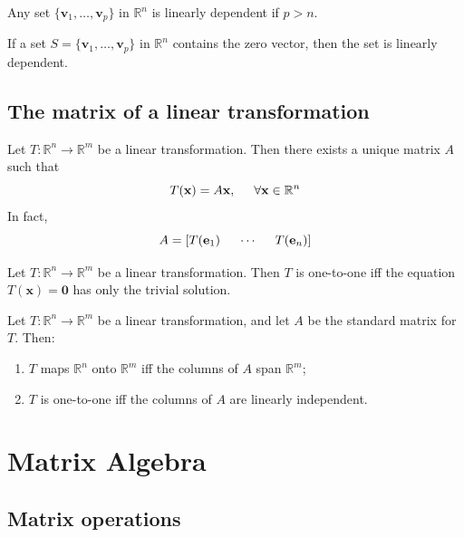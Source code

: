 \documentclass{article}
\begin{document}
\begin{thm}
    Any set $\{\textbf{v}_1,\ldots,\textbf{v}_p\}$ in $\mathbb{R}^n$ is linearly dependent if $p>n$.
\end{thm}

\begin{thm}
    If a set $S=\{\textbf{v}_1,\ldots,\textbf{v}_p\}$ in $\mathbb{R}^n$ contains the zero vector, then the set is linearly dependent.
\end{thm}

\subsection{The matrix of a linear transformation}

\begin{thm}
    Let $T:\mathbb{R}^n\to\mathbb{R}^m$ be a linear transformation. Then there exists a unique matrix $A$ such that $$T(\textbf{x})=A\textbf{x},\hspace{.5cm}\forall\textbf{x}\in\mathbb{R}^n$$ In fact, $$A=[T(\textbf{e}_1)\hspace{.5cm}\cdots\hspace{.5cm}T(\textbf{e}_n)]$$    
\end{thm}

\begin{thm}
    Let $T:\mathbb{R}^n\to\mathbb{R}^m$ be a linear transformation. Then $T$ is one-to-one iff the equation $T(\textbf{x})=\textbf{0}$ has only the trivial solution.
\end{thm}

\begin{thm}
    Let $T:\mathbb{R}^n\to\mathbb{R}^m$ be a linear transformation, and let $A$ be the standard matrix for $T$. Then:
    \begin{enumerate}
        \item[a.] $T$ maps $\mathbb{R}^n$ onto $\mathbb{R}^m$ iff the columns of $A$ span $\mathbb{R}^m$;
        \item[b.] $T$ is one-to-one iff the columns of $A$ are linearly independent.
    \end{enumerate}
\end{thm}
    
\section{Matrix Algebra}

\subsection{Matrix operations}
\end{document}
